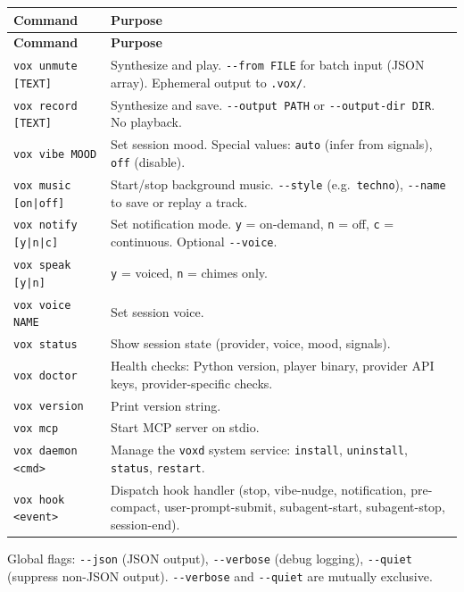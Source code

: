 \documentclass[a4paper,10pt]{article}
\begin{document}
\begin{center}
\begin{longtable}{lp{8cm}}
\toprule
\textbf{Command} & \textbf{Purpose} \\
\midrule
\endfirsthead
\toprule
\textbf{Command} & \textbf{Purpose} \\
\midrule
\endhead
\texttt{vox unmute [TEXT]} & Synthesize and play.
  \texttt{-{}-from FILE} for batch input (JSON array).
  Ephemeral output to \texttt{.vox/}. \\
\texttt{vox record [TEXT]} & Synthesize and save.
  \texttt{-{}-output PATH} or \texttt{-{}-output-dir DIR}.
  No playback. \\
\texttt{vox vibe MOOD}     & Set session mood.  Special values:
  \texttt{auto} (infer from signals), \texttt{off} (disable). \\
\texttt{vox music [on|off]} & Start/stop background music.
  \texttt{-{}-style} (e.g.\ \texttt{techno}), \texttt{-{}-name} to save
  or replay a track. \\
\texttt{vox notify [y|n|c]} & Set notification mode.
  \texttt{y} = on-demand, \texttt{n} = off, \texttt{c} = continuous.
  Optional \texttt{-{}-voice}. \\
\texttt{vox speak [y|n]}   & \texttt{y} = voiced, \texttt{n} = chimes
  only. \\
\texttt{vox voice NAME}    & Set session voice. \\
\texttt{vox status}        & Show session state (provider, voice,
  mood, signals). \\
\texttt{vox doctor}        & Health checks: Python version,
  player binary, provider API keys, provider-specific checks. \\
\texttt{vox version}       & Print version string. \\
\texttt{vox mcp}           & Start MCP server on stdio. \\
\texttt{vox daemon <cmd>}  & Manage the \texttt{voxd} system service:
  \texttt{install}, \texttt{uninstall}, \texttt{status},
  \texttt{restart}. \\
\texttt{vox hook <event>}  & Dispatch hook handler (stop,
  vibe-nudge, notification, pre-compact, user-prompt-submit,
  subagent-start, subagent-stop, session-end). \\
\bottomrule
\end{longtable}
\end{center}

Global flags: \texttt{-{}-json} (JSON output), \texttt{-{}-verbose}
(debug logging), \texttt{-{}-quiet} (suppress non-JSON output).
\texttt{-{}-verbose} and \texttt{-{}-quiet} are mutually exclusive.
\end{document}
